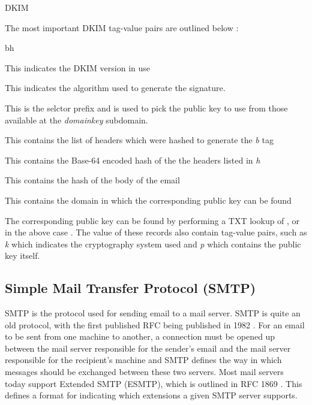 \begin{labeling}{DKIM }
  

  The most important DKIM tag-value pairs are outlined below \cite{dkimSig}:
  \begin{labeling}{bh }
    \item[v] This indicates the DKIM version in use
    \item[a] This indicates the algorithm used to generate the signature.
    \item[s] This is the selctor prefix and is used to pick the public key to use from those available at the \textit{\textunderscore domainkey} subdomain.
    \item[h] This contains the list of headers which were hashed to generate the \textit{b} tag
    \item[b] This contains the Base-64 encoded hash of the the headers listed in \textit{h}
    \item[bh] This contains the hash of the body of the email
    \item[d] This contains the domain in which the corresponding public key can be found
  \end{labeling}

  The corresponding public key can be found by performing a TXT lookup of , or in the above case . The value of these records also contain tag-value pairs, such as \textit{k} which indicates the cryptography system used and \textit{p} which contains the public key itself.
  
\end{labeling}


\subsection{Simple Mail Transfer Protocol (SMTP)} \label{sec:smtp}
SMTP is the protocol used for sending email to a mail server. SMTP is quite an old protocol, with the first published RFC being published in 1982 \cite{smtpRfc}. For an email to be sent from one machine to another, a connection must be opened up between the mail server responsible for the sender's email and the mail server responsible for the recipient's machine and SMTP defines the way in which messages should be exchanged between these two servers. Most mail servers today support 
Extended SMTP (ESMTP), which is outlined in RFC 1869 \cite{esmtpRfc}. This defines a format for indicating which extensions a given SMTP server supports. 

